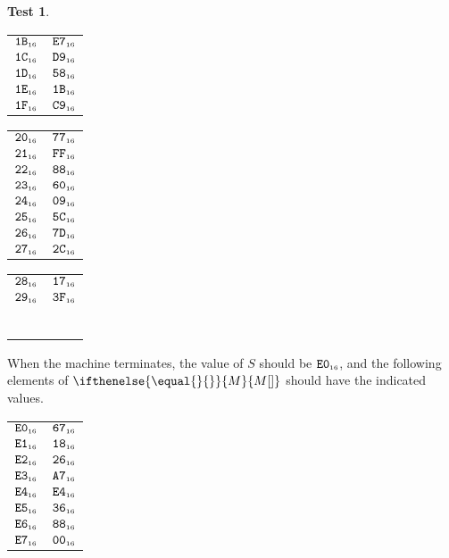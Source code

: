 \documentclass[a4paper,12pt]{article}
\makeatletter
\newcommand{\num}[1]{\texttt{#1}}
\newcommand{\hex}[1]{\num{#1}_{\textup{\tiny 16}}}
\newcommand{\MEM}[1]{\ifthenelse{\equal{#1}{}}{M}{M[#1]}}
\newcommand{\SP}{S}
\theoremstyle{definition}
\newtheorem{test}{Test}
\newenvironment{memtable}{%
  \begin{trivlist}
    \item
    }{%
    \end{trivlist}}
\newenvironment{memcolumn}{%
  \begin{tabular}{@{}ll@{}}
    \hline}
    {%
    \hline
  \end{tabular}}
\newcommand{\memspace}{\qquad}
\makeatother
\begin{document}
\begin{test}
\begin{memtable}
\begin{memcolumn}
      $\hex{1B}$ & $\hex{E7}$ \\
      $\hex{1C}$ & $\hex{D9}$ \\
      $\hex{1D}$ & $\hex{58}$ \\
      $\hex{1E}$ & $\hex{1B}$ \\
      $\hex{1F}$ & $\hex{C9}$ \\
    \end{memcolumn}
    \memspace
    \begin{memcolumn}
      $\hex{20}$ & $\hex{77}$ \\
      $\hex{21}$ & $\hex{FF}$ \\
      $\hex{22}$ & $\hex{88}$ \\
      $\hex{23}$ & $\hex{60}$ \\
      $\hex{24}$ & $\hex{09}$ \\
      $\hex{25}$ & $\hex{5C}$ \\
      $\hex{26}$ & $\hex{7D}$ \\
      $\hex{27}$ & $\hex{2C}$ \\
    \end{memcolumn}
    \memspace
    \begin{memcolumn}
      $\hex{28}$ & $\hex{17}$ \\
      $\hex{29}$ & $\hex{3F}$ \\
      \\
      \\
      \\
      \\
      \\
      \\
    \end{memcolumn}
  \end{memtable}
  When the machine terminates, the value of $\SP$ should be $\hex{E0}$, and the following elements of $\MEM{}$ should have the indicated values.
  \begin{memtable}
    \begin{memcolumn}
      $\hex{E0}$ & $\hex{67}$ \\
      $\hex{E1}$ & $\hex{18}$ \\
      $\hex{E2}$ & $\hex{26}$ \\
      $\hex{E3}$ & $\hex{A7}$ \\
      $\hex{E4}$ & $\hex{E4}$ \\
      $\hex{E5}$ & $\hex{36}$ \\
      $\hex{E6}$ & $\hex{88}$ \\
      $\hex{E7}$ & $\hex{00}$ \\

\end{memcolumn}
\end{memtable}
\end{test}
\end{document}
